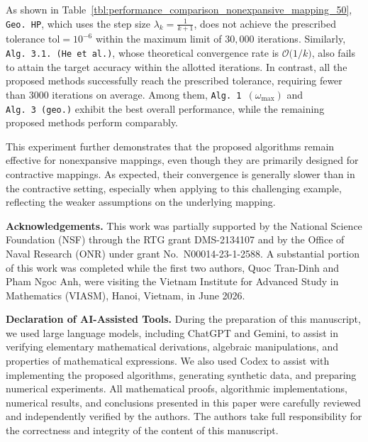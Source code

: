 \documentclass{article}
\theoremstyle{plain}
\theoremstyle{definition}
\newcommand{\0}{\boldsymbol{0}}
\newcommand{\BigOs}[1]{\mathcal{O}\big(#1\big)}
\begin{document}
As shown in Table~\ref{tbl:performance_comparison_nonexpansive_mapping_50}, \texttt{Geo.~HP}, which uses the step size $\lambda_k = \frac{1}{k+1}$, does not achieve the prescribed tolerance $\mathrm{tol} = 10^{-6}$ within the maximum limit of $30,\!000$ iterations. 
Similarly, \texttt{Alg.~3.1.~(He~et~al.)}, whose theoretical convergence rate is $\BigOs{1/k}$, also fails to attain the target accuracy within the allotted iterations. 
In contrast, all the proposed methods successfully reach the prescribed tolerance, requiring fewer than $3000$ iterations on average. 
Among them, \texttt{Alg.~1~$(\omega_{\max})$} and \texttt{Alg.~3~(geo.)} exhibit the best overall performance, while the remaining proposed methods perform comparably.

This experiment further demonstrates that the proposed algorithms remain effective for nonexpansive mappings, even though they are primarily designed for contractive mappings. 
As expected, their convergence is generally slower than in the contractive setting, especially when applying to this challenging example, reflecting the weaker assumptions on the underlying mapping.

\vspace{1ex}
\noindent\textbf{Acknowledgements.}
This work was partially supported by the National Science Foundation (NSF) through the RTG grant DMS-2134107 and by the Office of Naval Research (ONR) under grant No.~N00014-23-1-2588. 
A substantial portion of this work was completed while the first two authors, Quoc Tran-Dinh and Pham Ngoc Anh, were visiting the Vietnam Institute for Advanced Study in Mathematics (VIASM), Hanoi, Vietnam, in June 2026.

\vspace{1ex}
\noindent\textbf{Declaration of AI-Assisted Tools.}
During the preparation of this manuscript, we used large language models, including ChatGPT and Gemini, to assist in verifying elementary mathematical derivations, algebraic manipulations, and properties of mathematical expressions. We also used Codex to assist with implementing the proposed algorithms, generating synthetic data, and preparing numerical experiments.
%
All mathematical proofs, algorithmic implementations, numerical results, and conclusions presented in this paper were carefully reviewed and independently verified by the authors. The authors take full responsibility for the correctness and integrity of the content of this manuscript.


%
\end{document}
